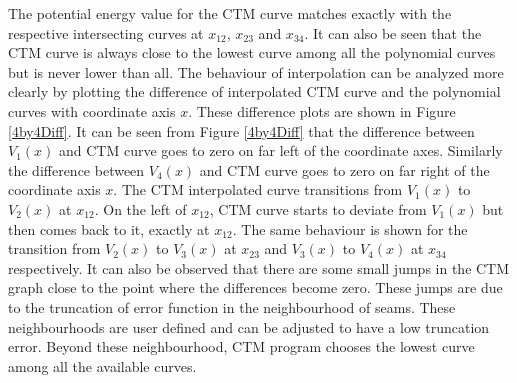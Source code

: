 The potential energy value for the CTM curve matches exactly with the respective intersecting
curves at $x_{12}$, $x_{23}$ and $x_{34}$. It can also be seen that the CTM curve is always close
to the lowest curve among all the polynomial curves but is never lower than all. The behaviour of
interpolation can be analyzed more clearly by plotting the difference of interpolated CTM curve and
the polynomial curves with coordinate axis $x$. These difference plots are shown in Figure
\ref{4by4Diff}. It can be seen from Figure \ref{4by4Diff} that the difference between $V_{1}(x)$ and
CTM curve goes to zero on far left of the coordinate axes. Similarly the difference between
$V_{4}(x)$ and CTM curve goes to zero on far right of the coordinate axis $x$.
The CTM interpolated curve transitions from $V_{1}(x)$ to $V_{2}(x)$ at $x_{12}$. On the left of
$x_{12}$, CTM curve starts to deviate from $V_{1}(x)$ but then comes back to it, exactly at $x_{12}$.
The same behaviour is shown for the transition from $V_{2}(x)$ to $V_{3}(x)$ at $x_{23}$ and
$V_{3}(x)$ to $V_{4}(x)$ at $x_{34}$ respectively. It can also be observed that there are some small
jumps in the CTM graph close to the point where the differences become zero. These jumps are due to the
truncation of error function in the neighbourhood of seams. These neighbourhoods are user
defined and can be adjusted to have a low truncation error. Beyond these neighbourhood, CTM program
chooses the lowest curve among all the available curves.

\newpage

